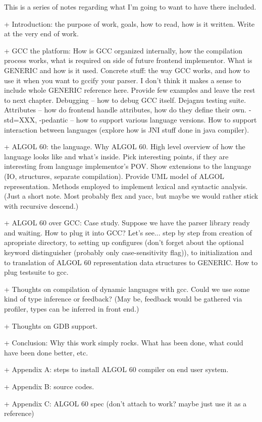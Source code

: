 \documentclass[a4paper,11pt]{report}
\begin{document}
This is a series of notes regarding what I'm going to want to have
there included.

 + Introduction: the purpose of work, goals, how to read, how is it
 written.  Write at the very end of work.

 + GCC the platform: How is GCC organized internally, how the
 compilation process works, what is required on side of future
 frontend implementor.  What is GENERIC and how is it used.  Concrete
 stuff: the way GCC works, and how to use it when you want to gccify
 your parser.  I don't think it makes a sense to include whole GENERIC
 reference here.  Provide few examples and leave the rest to next
 chapter.  Debugging -- how to debug GCC itself.  Dejagnu testing
 suite.  Attributes -- how do frontend handle attributes, how do they
 define their own.  -std=XXX, -pedantic -- how to support various
 language versions.  How to support interaction between languages
 (explore how is JNI stuff done in java compiler).

 + ALGOL 60: the language.  Why ALGOL 60.  High level overview of how
 the language looks like and what's inside.  Pick interesting points,
 if they are interesting from language implementor's POV.  Show
 extensions to the language (IO, structures, separate compilation).
 Provide UML model of ALGOL representation.  Methods employed to
 implement lexical and syntactic analysis. (Just a short note.  Most
 probably flex and yacc, but maybe we would rather stick with
 recursive descend.)

 + ALGOL 60 over GCC: Case study.  Suppose we have the parser library
 ready and waiting.  How to plug it into GCC?  Let's see... step by
 step from creation of apropriate directory, to setting up configures
 (don't forget about the optional keyword distinguisher (probably only
 case-sensitivity flag)), to initialization and to translation of
 ALGOL 60 representation data structures to GENERIC.  How to plug
 testsuite to gcc.

 + Thoughts on compilation of dynamic languages with gcc.  Could we
 use some kind of type inference or feedback? (May be, feedback would
 be gathered via profiler, types can be inferred in front end.)

 + Thoughts on GDB support.

 + Conclusion: Why this work simply rocks.  What has been done, what
 could have been done better, etc.

 + Appendix A: steps to install ALGOL 60 compiler on end user system.

 + Appendix B: source codes.

 + Appendix C: ALGOL 60 spec (don't attach to work? maybe just use it
 as a reference)
\end{document}
